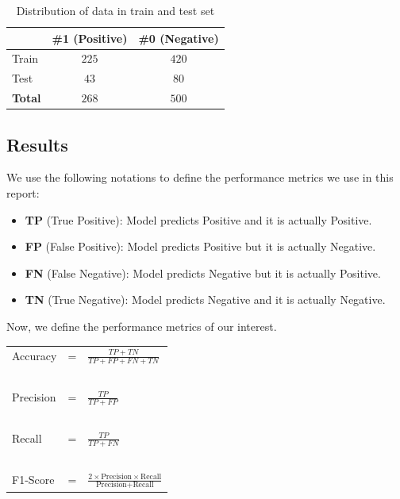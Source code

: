 \documentclass[11pt,a4paper]{article}
\begin{document}
\begin{table}[h]
\centering
\begin{tabular}{| l | c c |}
\hline ~ & \textbf{\#1 (Positive)} & \textbf{\#0 (Negative)} \\ \hline
Train & $225$ & $420$ \\
Test & $43$ & $80$ \\ \hline
\textbf{Total} & $268$ & $500$ \\
\hline
\end{tabular}
\caption{\label{tab:dataset-distr} Distribution of data in train and test set}
\end{table}


\subsection{Results}
\label{sec:results}
We use the following notations to define the performance metrics we use in this report:
\begin{itemize}
    \item \textbf{TP} (True Positive): Model predicts Positive and it is actually Positive.
    \item \textbf{FP} (False Positive): Model predicts Positive but it is actually Negative.
    \item \textbf{FN} (False Negative): Model predicts Negative but it is actually Positive.
    \item \textbf{TN} (True Negative): Model predicts Negative and it is actually Negative.
\end{itemize}

Now, we define the performance metrics of our interest.
\begin{table}[htpb]
\centering
\begin{tabular}{lcl}
Accuracy & = & $\frac{TP + TN}{TP + FP + FN + TN}$ \\
~ & ~ & ~ \\
Precision & = & $\frac{TP}{TP + FP}$ \\
~ & ~ & ~ \\
Recall & = & $\frac{TP}{TP + FN}$ \\
~ & ~ & ~ \\
F1-Score & = & $\frac{2 \times \text{Precision} \times
\text{Recall}}{\text{Precision}+\text{Recall}}$ \\
\end{tabular}
\end{table}
\end{document}
